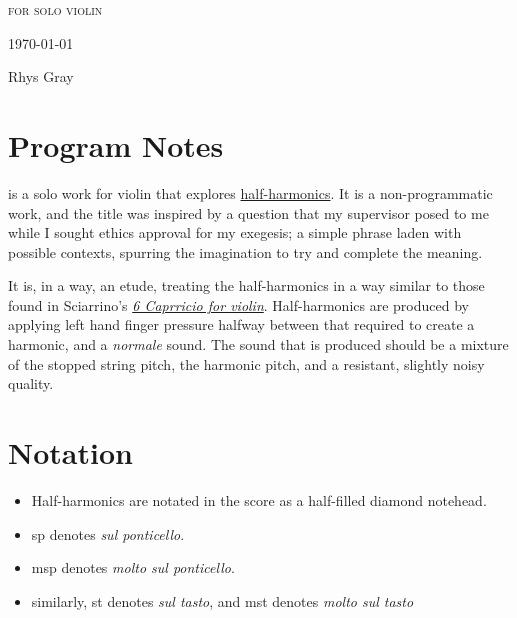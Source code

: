 \newpage

\invisiblechapter{\violinPiece}

\vspace{3.8cm}

\begin{center}

\textsc{for solo violin}

\vspace{2.8cm}

\HRule{0.5pt}

\LARGE \textbf{\uppercase{\violinPiece}}

\HRule{2pt}

\vspace{1.8cm}

\normalsize \today

\vspace{3.8cm}

Rhys Gray

\end{center}
\newpage
\section*{Program Notes}
\violinPiece is a solo work for violin that explores \hyperref[sec:halfHarmonicsDiscussion]{half-harmonics}.
It is a non-programmatic work, and the title was inspired by a question that my supervisor posed to me while I sought ethics approval for my exegesis; a simple phrase laden with possible contexts, spurring the imagination to try and complete the meaning.

It is, in a way, an etude, treating the half-harmonics in a way similar to those found in Sciarrino's \hyperref[fig:sciarrinoExcerpt]{\emph{6 Caprricio for violin}}. 
Half-harmonics are produced by applying left hand finger pressure halfway between that required to create a harmonic, and a \emph{normale} sound. 
The sound that is produced should be a mixture of the stopped string pitch, the harmonic pitch, and a resistant, slightly noisy quality.

\section*{Notation}
\begin{itemize}

    \item Half-harmonics are notated in the score as a half-filled diamond notehead.
    \item sp denotes \emph{sul ponticello}.
    \item msp denotes \emph{molto sul ponticello}.
    \item similarly, st denotes \emph{sul tasto}, and mst denotes \emph{molto sul tasto}
\end{itemize}

\newpage

% 
\label{violinPiece}
